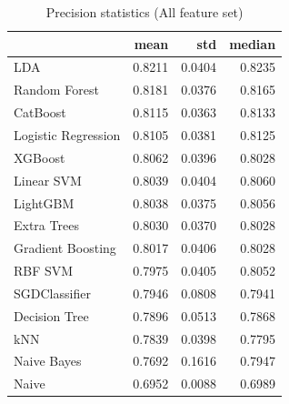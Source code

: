 \begin{table}
\caption{Precision statistics (All feature set)}
\label{tab:precision_All_stats}
\begin{tabular}{lrrr}
\toprule
 & mean & std & median \\
\midrule
LDA & 0.8211 & 0.0404 & 0.8235 \\
Random Forest & 0.8181 & 0.0376 & 0.8165 \\
CatBoost & 0.8115 & 0.0363 & 0.8133 \\
Logistic Regression & 0.8105 & 0.0381 & 0.8125 \\
XGBoost & 0.8062 & 0.0396 & 0.8028 \\
Linear SVM & 0.8039 & 0.0404 & 0.8060 \\
LightGBM & 0.8038 & 0.0375 & 0.8056 \\
Extra Trees & 0.8030 & 0.0370 & 0.8028 \\
Gradient Boosting & 0.8017 & 0.0406 & 0.8028 \\
RBF SVM & 0.7975 & 0.0405 & 0.8052 \\
SGDClassifier & 0.7946 & 0.0808 & 0.7941 \\
Decision Tree & 0.7896 & 0.0513 & 0.7868 \\
kNN & 0.7839 & 0.0398 & 0.7795 \\
Naive Bayes & 0.7692 & 0.1616 & 0.7947 \\
Naive & 0.6952 & 0.0088 & 0.6989 \\
\bottomrule
\end{tabular}
\end{table}
